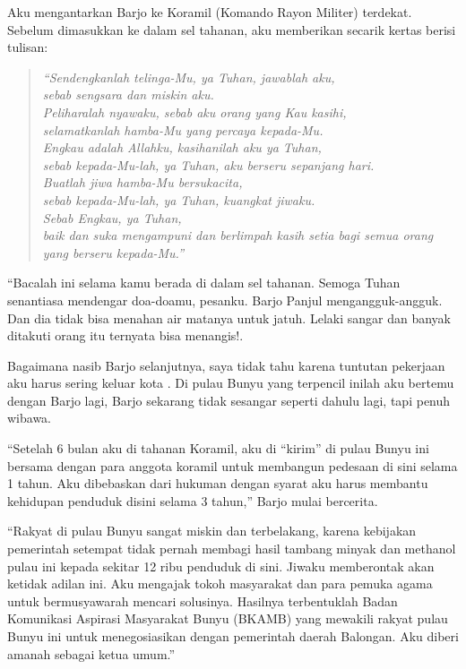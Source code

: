 Aku mengantarkan Barjo ke Koramil (Komando Rayon Militer) terdekat. Sebelum dimasukkan ke dalam sel tahanan, aku memberikan secarik kertas berisi tulisan:

\begin{quote}
\textit{``Sendengkanlah telinga-Mu, ya Tuhan, jawablah aku, \\sebab sengsara dan miskin aku. \\
Peliharalah nyawaku, sebab aku orang yang Kau kasihi,\\ selamatkanlah  hamba-Mu yang percaya kepada-Mu. \\
Engkau adalah Allahku, kasihanilah aku ya Tuhan, \\sebab kepada-Mu-lah, ya Tuhan, aku berseru sepanjang hari.\\ Buatlah jiwa hamba-Mu bersukacita, \\sebab kepada-Mu-lah, ya Tuhan, kuangkat jiwaku. \\Sebab Engkau, ya Tuhan,\\ baik dan suka mengampuni dan berlimpah kasih setia bagi semua orang yang berseru kepada-Mu.''
}
\end{quote}

``Bacalah ini selama kamu berada di dalam sel tahanan. Semoga Tuhan senantiasa mendengar doa-doamu, pesanku. Barjo Panjul mengangguk-angguk. Dan dia tidak bisa menahan air matanya untuk jatuh. Lelaki sangar dan banyak ditakuti orang itu ternyata bisa menangis!.

Bagaimana nasib Barjo selanjutnya, saya tidak tahu karena tuntutan pekerjaan aku harus sering keluar kota .  Di pulau Bunyu yang terpencil inilah aku bertemu dengan Barjo lagi, Barjo sekarang tidak sesangar  seperti dahulu lagi, tapi penuh wibawa.

``Setelah 6 bulan aku di tahanan Koramil, aku di ``kirim'' di pulau Bunyu ini bersama dengan para anggota koramil untuk membangun pedesaan di sini selama 1 tahun. Aku dibebaskan dari hukuman dengan syarat aku harus membantu kehidupan penduduk disini selama 3 tahun,'' Barjo mulai bercerita.

``Rakyat di pulau Bunyu sangat miskin dan terbelakang, karena kebijakan pemerintah setempat tidak pernah membagi hasil tambang minyak dan methanol pulau ini kepada sekitar 12 ribu penduduk  di sini. Jiwaku memberontak akan ketidak adilan ini. Aku mengajak tokoh masyarakat dan para pemuka agama untuk bermusyawarah mencari solusinya. Hasilnya terbentuklah Badan Komunikasi Aspirasi Masyarakat Bunyu (BKAMB) yang mewakili rakyat pulau Bunyu ini untuk menegosiasikan dengan pemerintah daerah Balongan. Aku diberi amanah sebagai ketua umum.''

